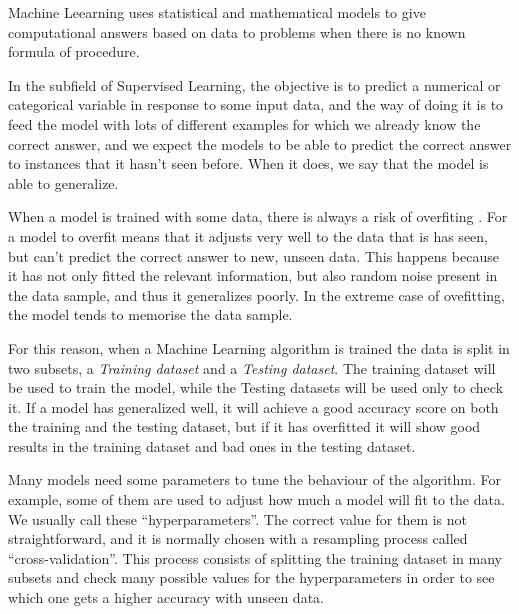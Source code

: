 \begin{pre-delivery}

  Machine Leearning uses statistical and mathematical models to give
  computational answers based on data to problems when there is no known
  formula of procedure.

  In the subfield of Supervised Learning, the objective is to predict a numerical
  or categorical variable in response to some input data, and the way of doing
  it is to feed the model with lots of different examples for which we already
  know the correct answer, and we expect the models to be able to predict
  the correct answer to instances that it hasn't seen before. When it does,
  we say that the model is able to generalize.

  When a model is trained with some data, there is always a risk of overfiting
  \cite{hawkins2004problem}.
  For a model to overfit means that it adjusts very well to the data that is
  has seen, but can't predict the correct answer to new, unseen data.
  This happens because it has not only fitted the relevant information,
  but also random noise present in the data sample, and thus it generalizes
  poorly. In the extreme case of ovefitting, the model tends to memorise the
  data sample.

  For this reason, when a Machine Learning algorithm is trained the data
  is split in two subsets, a \textit{Training  dataset} and a \textit{Testing
  dataset}. The training dataset will be used to train the model, while the
  Testing datasets will be used only to check it. If a model has generalized
  well, it will achieve a good accuracy score on both the training and the
  testing dataset, but if it has overfitted it will show good results in the
  training dataset and bad ones in the testing dataset.

  Many models need some parameters to tune the behaviour of the algorithm. For
  example, some of them are used to adjust how much a model will fit to the data.
  We usually call these ``hyperparameters''. The correct value for them is not
  straightforward, and it is normally chosen with a resampling process called
  ``cross-validation''\cite{geisser2017predictive}. This process consists of
  splitting the training dataset
  in many subsets and check many possible values for the hyperparameters in order
  to see which one gets a higher accuracy with unseen data.
\end{pre-delivery}

